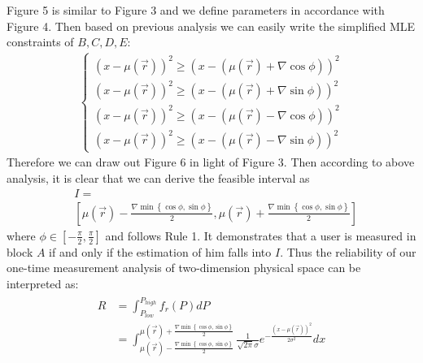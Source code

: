 \documentclass[10pt,conference,compsocconf,letterpaper]{IEEEtran}
\begin{document}
Figure 5 is similar to Figure 3 and we define parameters in accordance with Figure 4. Then based on previous analysis we can easily write the simplified MLE constraints of $B, C, D, E$:
\begin{align}
\left\{\begin{array}{l}
{(x - \mu (\vec r))^2} \ge {(x - (\mu (\vec r) + \nabla \cos \phi ))^2}\\
{(x - \mu (\vec r))^2} \ge {(x - (\mu (\vec r) + \nabla \sin \phi ))^2}\\
{(x - \mu (\vec r))^2} \ge {(x - (\mu (\vec r) - \nabla \cos \phi ))^2}\\
{(x - \mu (\vec r))^2} \ge {(x - (\mu (\vec r) - \nabla \sin \phi ))^2}
\end{array}\right.
\end{align}
Therefore we can draw out Figure 6 in light of Figure 3. Then according to above analysis, it is clear that we can derive the feasible interval as
\begin{equation}
\begin{split}
&I =\\ 
&\left[ {\mu (\vec r) - \frac{{\nabla \min \left\{ {\cos \phi ,\sin \phi } \right\}}}{2},
\mu (\vec r)+\frac{{\nabla \min \left\{ {\cos \phi ,\sin \phi } \right\}}}{2}} \right]
 \end{split}
 \end{equation} 
where $\phi  \in \left[ { - \frac{\pi }{2},\frac{\pi }{2}} \right]$ and follows Rule 1. It demonstrates that a user is measured in block $A$ if and only if the estimation of him falls into $I$. Thus the reliability of our one-time measurement analysis of two-dimension physical space can be interpreted as:
\begin{align}
\begin{split}
R &= \int_{{P_{low}}}^{{P_{high}}} {{f_r}(P)dP }\\
 &=\int_{\mu (\vec r) - \frac{{\nabla \min \left\{ {\cos \phi ,\sin \phi } \right\}}}{2}}^{\mu (\vec r) + \frac{{\nabla \min \left\{ {\cos \phi ,\sin \phi } \right\}}}{2}} {\frac{1}{{\sqrt {2\pi } \sigma }}{e^{ - \frac{{{{(x - \mu (\vec r))}^2}}}{{2{\sigma ^2}}}}}dx}
 \end{split}
\end{align}
\end{document}
